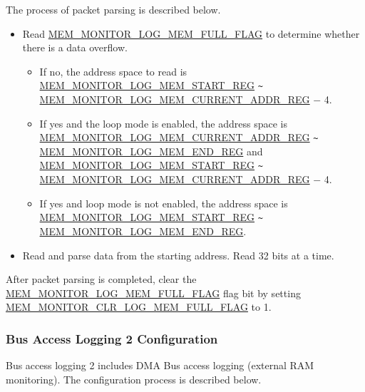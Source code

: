 \documentclass[main\_\_EN.tex]{subfiles}
\begin{document}
The process of packet parsing is described below.

\begin{itemize}
    \item Read \hyperref[fielddesc:MEMMONITORLOGMEMFULLFLAG]{MEM\_MONITOR\_LOG\_MEM\_FULL\_FLAG} to determine whether there is a data overflow.
    \begin{itemize}
        \item If no, the address space to read is \hyperref[regdesc:MEMMONITORLOGMEMSTARTREG]{MEM\_MONITOR\_LOG\_MEM\_START\_REG} \verb+~+ \hyperref[regdesc:MEMMONITORLOGMEMCURRENTADDRREG]{MEM\_MONITOR\_LOG\_MEM\_CURRENT\_ADDR\_REG} $-$ 4.
        \item If yes and the loop mode is enabled, the address space is \hyperref[regdesc:MEMMONITORLOGMEMCURRENTADDRREG]{MEM\_MONITOR\_LOG\_MEM\_CURRENT\_ADDR\_REG} \verb+~+ \hyperref[regdesc:MEMMONITORLOGMEMENDREG]{MEM\_MONITOR\_LOG\_MEM\_END\_REG} and \hyperref[regdesc:MEMMONITORLOGMEMSTARTREG]{MEM\_MONITOR\_LOG\_MEM\_START\_REG} \verb+~+ \hyperref[regdesc:MEMMONITORLOGMEMCURRENTADDRREG]{MEM\_MONITOR\_LOG\_MEM\_CURRENT\_ADDR\_REG} $-$ 4.
        \item If yes and loop mode is not enabled, the address space is \hyperref[regdesc:MEMMONITORLOGMEMSTARTREG]{MEM\_MONITOR\_LOG\_MEM\_START\_REG} \verb+~+ \hyperref[regdesc:MEMMONITORLOGMEMENDREG]{MEM\_MONITOR\_LOG\_MEM\_END\_REG}.
    \end{itemize}
    \item Read and parse data from the starting address. Read 32 bits at a time.
\end{itemize}

After packet parsing is completed, clear the \hyperref[fielddesc:MEMMONITORLOGMEMFULLFLAG]{MEM\_MONITOR\_LOG\_MEM\_FULL\_FLAG} flag bit by setting \hyperref[fielddesc:MEMMONITORCLRLOGMEMFULLFLAG]{MEM\_MONITOR\_CLR\_LOG\_MEM\_FULL\_FLAG} to 1.


\subsubsection{Bus Access Logging 2 Configuration}

Bus access logging 2 includes DMA Bus access logging (external RAM monitoring). The configuration process is described below.
\end{document}
